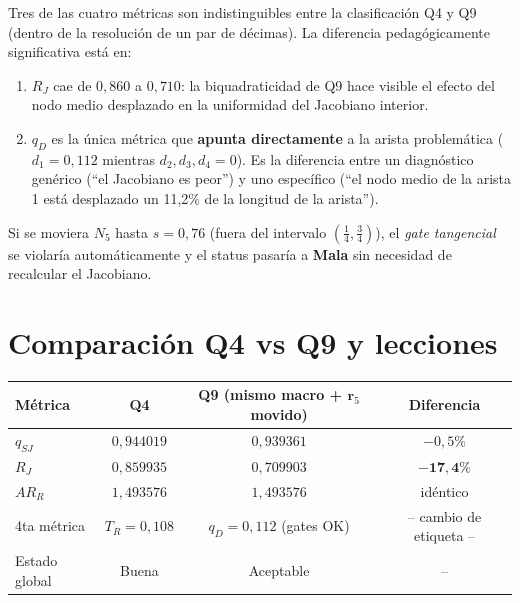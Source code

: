 \documentclass[11pt,a4paper]{article}
\begin{document}
\begin{interpretbox}[title={Interpretaci\'on pedag\'ogica Q9}]
Tres de las cuatro m\'etricas son indistinguibles entre la clasificaci\'on Q4 y Q9 (dentro de la resoluci\'on de un par de d\'ecimas). La diferencia pedag\'ogicamente significativa est\'a en:
\begin{enumerate}[leftmargin=1.2em,itemsep=1pt]
  \item $R_J$ cae de $0{,}860$ a $0{,}710$: la biquadraticidad de Q9 hace visible el efecto del nodo medio desplazado en la uniformidad del Jacobiano interior.
  \item $q_D$ es la \'unica m\'etrica que \textbf{apunta directamente} a la arista problem\'atica ($d_1=0{,}112$ mientras $d_2,d_3,d_4=0$). Es la diferencia entre un diagn\'ostico gen\'erico (``el Jacobiano es peor'') y uno espec\'ifico (``el nodo medio de la arista 1 est\'a desplazado un 11,2\% de la longitud de la arista'').
\end{enumerate}
Si se moviera $N_5$ hasta $s=0{,}76$ (fuera del intervalo $(\tfrac{1}{4},\tfrac{3}{4})$), el \emph{gate tangencial} se violar\'ia autom\'aticamente y el status pasar\'ia a \textcolor{bad}{\textbf{Mala}} sin necesidad de recalcular el Jacobiano.
\end{interpretbox}

\section{Comparaci\'on Q4 vs Q9 y lecciones}
\label{sec:comp}

\begin{center}
\renewcommand{\arraystretch}{1.25}
\begin{tabular}{lccc}
\toprule
M\'etrica & Q4 & Q9 (mismo macro + $\mathbf{r}_5$ movido) & Diferencia \\
\midrule
$q_{SJ}$ & $0{,}944019$ & $0{,}939361$ & $-0{,}5\%$ \\
$R_J$    & $0{,}859935$ & $0{,}709903$ & $\mathbf{-17{,}4\%}$ \\
$AR_R$   & $1{,}493576$ & $1{,}493576$ & id\'entico \\
4ta m\'etrica & $T_R=0{,}108$ & $q_D=0{,}112$ (gates OK) & -- cambio de etiqueta -- \\
\midrule
Estado global & \textcolor{good}{Buena} & \textcolor{warn}{Aceptable} & -- \\
\bottomrule
\end{tabular}
\end{center}
\end{document}
